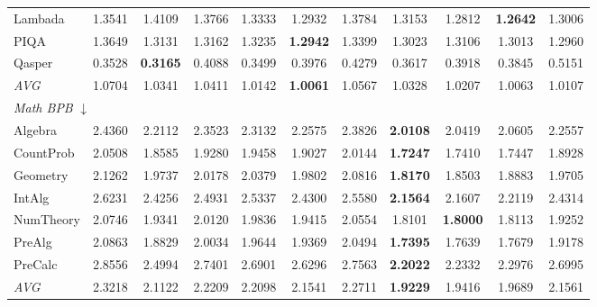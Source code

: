 \begin{table}[htbp]
\begin{tabular}{lcccccccccc}
Lambada & 1.3541 & 1.4109 & 1.3766 & 1.3333 & 1.2932 & 1.3784 & 1.3153 & 1.2812 & \textbf{1.2642} & 1.3006 \\
PIQA & 1.3649 & 1.3131 & 1.3162 & 1.3235 & \textbf{1.2942} & 1.3399 & 1.3023 & 1.3106 & 1.3013 & 1.2960 \\
Qasper & 0.3528 & \textbf{0.3165} & 0.4088 & 0.3499 & 0.3976 & 0.4279 & 0.3617 & 0.3918 & 0.3845 & 0.5151 \\
\textit{AVG} & 1.0704 & 1.0341 & 1.0411 & 1.0142 & \textbf{1.0061} & 1.0567 & 1.0328 & 1.0207 & 1.0063 & 1.0107 \\
\midrule
\multicolumn{11}{l}{\textit{Math BPB} $\downarrow$} \\
Algebra & 2.4360 & 2.2112 & 2.3523 & 2.3132 & 2.2575 & 2.3826 & \textbf{2.0108} & 2.0419 & 2.0605 & 2.2557 \\
CountProb & 2.0508 & 1.8585 & 1.9280 & 1.9458 & 1.9027 & 2.0144 & \textbf{1.7247} & 1.7410 & 1.7447 & 1.8928 \\
Geometry & 2.1262 & 1.9737 & 2.0178 & 2.0379 & 1.9802 & 2.0816 & \textbf{1.8170} & 1.8503 & 1.8883 & 1.9705 \\
IntAlg & 2.6231 & 2.4256 & 2.4931 & 2.5337 & 2.4300 & 2.5580 & \textbf{2.1564} & 2.1607 & 2.2119 & 2.4314 \\
NumTheory & 2.0746 & 1.9341 & 2.0120 & 1.9836 & 1.9415 & 2.0554 & 1.8101 & \textbf{1.8000} & 1.8113 & 1.9252 \\
PreAlg & 2.0863 & 1.8829 & 2.0034 & 1.9644 & 1.9369 & 2.0494 & \textbf{1.7395} & 1.7639 & 1.7679 & 1.9178 \\
PreCalc & 2.8556 & 2.4994 & 2.7401 & 2.6901 & 2.6296 & 2.7563 & \textbf{2.2022} & 2.2332 & 2.2976 & 2.6995 \\
\textit{AVG} & 2.3218 & 2.1122 & 2.2209 & 2.2098 & 2.1541 & 2.2711 & \textbf{1.9229} & 1.9416 & 1.9689 & 2.1561 \\
\bottomrule
\end{tabular}
\end{table}

